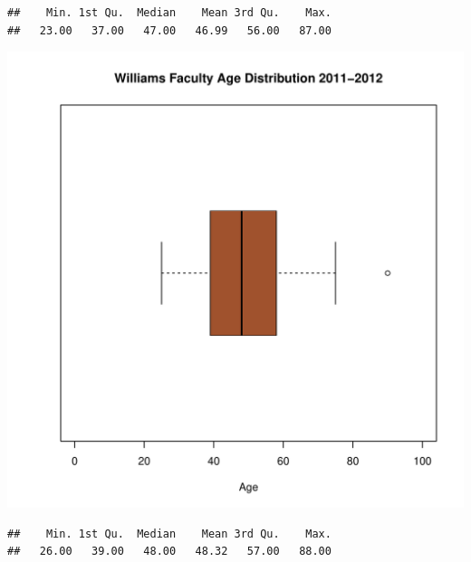 \documentclass[12pt,a4paper]{article}\usepackage[]{graphicx}\usepackage[]{color}
\makeatletter
\def\maxwidth{ %
  \ifdim\Gin@nat@width>\linewidth
    \linewidth
  \else
    \Gin@nat@width
  \fi
}
\newenvironment{kframe}{%
 \def\at@end@of@kframe{}%
 \ifinner\ifhmode%
  \def\at@end@of@kframe{\end{minipage}}%
  \begin{minipage}{\columnwidth}%
 \fi\fi%
 \def\FrameCommand##1{\hskip\@totalleftmargin \hskip-\fboxsep
 \colorbox{shadecolor}{##1}\hskip-\fboxsep
     \hskip-\linewidth \hskip-\@totalleftmargin \hskip\columnwidth}%
 \MakeFramed {\advance\hsize-\width
   \@totalleftmargin\z@ \linewidth\hsize
   \@setminipage}}%
 {\par\unskip\endMakeFramed%
 \at@end@of@kframe}
\newenvironment{knitrout}{}{} %
\theoremstyle{definition}
\makeatother
\begin{document}
\begin{knitrout}
\color{fgcolor}\begin{kframe}
\begin{verbatim}
##    Min. 1st Qu.  Median    Mean 3rd Qu.    Max. 
##   23.00   37.00   47.00   46.99   56.00   87.00
\end{verbatim}
\end{kframe}
\end{knitrout}

\begin{knitrout}
\color{fgcolor}
\includegraphics[width=\maxwidth]{figure/unnamed-chunk-36-1} 

\end{knitrout}

\begin{knitrout}
\color{fgcolor}\begin{kframe}
\begin{verbatim}
##    Min. 1st Qu.  Median    Mean 3rd Qu.    Max. 
##   26.00   39.00   48.00   48.32   57.00   88.00
\end{verbatim}
\end{kframe}
\end{knitrout}
\end{document}
